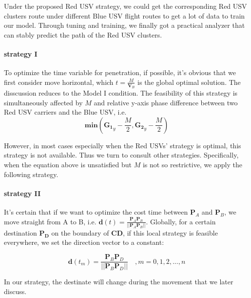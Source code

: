 \documentclass{mcmthesis}
\begin{document}
Under the proposed Red USV strategy, we could get the corresponding Red USV clusters route under different Blue USV flight routes to get a lot of data to train our model. Through tuning and training, we finally got a practical analyzer that can stably predict the path of the Red USV clusters. \par

\paragraph{strategy I}

To optimize the time variable for penetration, if possible, it's obvious that we first consider move horizontal, which $t=\frac{M}{\mathbf{V}_{B}}$ is the global optimal solution. The disscussion reduces to the Model I condition. The feasibility of this strategy is simultaneously affected by $M$ and relative y-axis phase difference between two Red USV carriers and the Blue USV, i.e. 
\begin{equation}
\mathbf{min}(\mathbf{G_1}_y - \frac{M}{2}, \mathbf{G_2}_y - \frac{M}{2})
\end{equation}

However, in most cases especially when the Red USVs' strategy is optimal, this strategy is not available. Thus we turn to consult other strategies. Specifically, when the equation above is unsatisfied but $M$ is not so restrictive, we apply the following strategy.

\paragraph{strategy II}

It's certain that if we want to optimize the cost time between $\mathbf{P}_A$ and $\mathbf{P}_B$, we move straight from A to B, i.e. $\mathbf{d}(t)=\frac{\mathbf{P}_A \mathbf{P}_B}{\vert \vert \mathbf{P}_A \mathbf{P}_B \vert \vert}$. Globally, for a certain destination $\mathbf{P_D}$ on the boundary of $\mathbf{CD}$, if this local strategy is feasible everywhere, we set the direction vector to a constant:

\begin{equation}
\mathbf{d}(t_m)=\frac{\mathbf{P}_B \mathbf{P}_D}{\vert \vert \mathbf{P}_B \mathbf{P}_D \vert \vert} \quad ,m = 0, 1, 2, ..., n
\end{equation}

In our strategy, the destinate will change during the movement that we later discuss.
\end{document}
